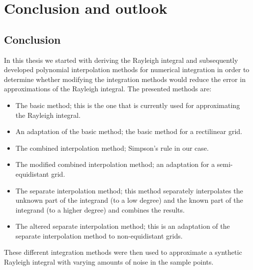 \chapter{Conclusion and outlook}
\label{conclusion}
\section{Conclusion}
In this thesis we started with deriving the Rayleigh integral and subsequently developed polynomial interpolation methods for numerical integration in order to determine whether modifying the integration methods would reduce the error in approximations of the Rayleigh integral.
The presented methods are:
\vspace{-.5em}
\begin{itemize}
    \itemsep0em
    \item The basic method; this is the one that is currently used for approximating the Rayleigh integral.
    \item An adaptation of the basic method; the basic method for a rectilinear grid.
    \item The combined interpolation method; Simpson's rule in our case.
    \item The modified combined interpolation method; an adaptation for a semi-equidistant grid.
    \item The separate interpolation method; this method separately interpolates the unknown part of the integrand (to a low degree) and the known part of the integrand (to a higher degree) and combines the results.
    \item The altered separate interpolation method; this is an adaptation of the separate interpolation method to non-equidistant grids.
\end{itemize}
\vspace{-.5em}
These different integration methods were then used to approximate a synthetic Rayleigh integral with varying amounts of noise in the sample points.

